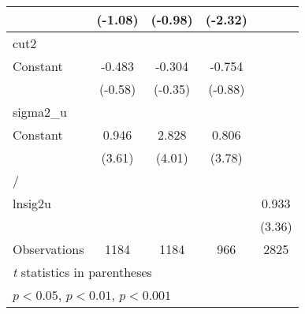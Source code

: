 {\begin{longtable}{l*{4}{c}}
                &  (-1.08)         &  (-0.98)         &  (-2.32)         &                  \\
\hline
cut2            &                  &                  &                  &                  \\
Constant        &   -0.483         &   -0.304         &   -0.754         &                  \\
                &  (-0.58)         &  (-0.35)         &  (-0.88)         &                  \\
\hline
sigma2\_u        &                  &                  &                  &                  \\
Constant        &    0.946\sym{***}&    2.828\sym{***}&    0.806\sym{***}&                  \\
                &   (3.61)         &   (4.01)         &   (3.78)         &                  \\
\hline
/               &                  &                  &                  &                  \\
lnsig2u         &                  &                  &                  &    0.933\sym{***}\\
                &                  &                  &                  &   (3.36)         \\
\hline
Observations    &     1184         &     1184         &      966         &     2825         \\
\hline\hline
\multicolumn{5}{l}{\footnotesize \textit{t} statistics in parentheses}\\
\multicolumn{5}{l}{\footnotesize \sym{*} \(p<0.05\), \sym{**} \(p<0.01\), \sym{***} \(p<0.001\)}\\
\end{longtable}
}
